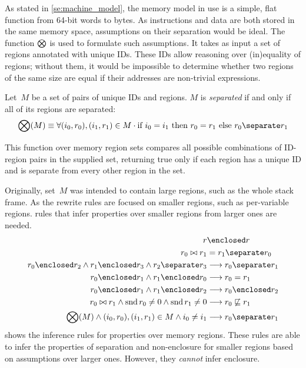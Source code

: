 As stated in \cref{se:machine_model}, the memory model in use is a simple,
flat function from 64-bit words to bytes.
As instructions and data are both stored in the same memory space,
assumptions on their separation would be ideal.
The function $\operatorname{\bigotimes}$ is used to formulate such assumptions.
It takes as input a set of regions annotated with unique IDs.
These IDs allow reasoning over (in)equality of regions; without them,
it would be impossible to determine whether two regions of the same size are equal
if their addresses are non-trivial expressions.
\begin{definition}
  Let~$M$ be a set of pairs of unique IDs and regions.
  $M$ is \emph{separated} if and only if all of its regions are separated:
  \begin{equation}
    \seps(M)\equiv\forall(i_0,r_0),(i_1,r_1)\in M\cdot
    \text{if }i_0=i_1\text{ then }r_0=r_1\text{ else }r_0\separate r_1
  \end{equation}
\end{definition}
This function over memory region sets compares all possible combinations of
ID-region pairs in the supplied set, returning true only if each region
has a unique ID and is separate from every other region in the set.

Originally, set~$M$ was intended to contain large regions,
such as the whole stack frame.
As the rewrite rules are focused on smaller regions, such as per-variable regions.
rules that infer properties over smaller regions from larger ones are needed.
\begin{subequations}\label{rules_sep_enc}
  \begin{align}
    r &\enclosed r \\
    r_0\bowtie r_1 &= r_1\separate r_0 \\
    r_0\enclosed r_2\wedge r_1\enclosed r_3\wedge r_2\separate r_3 &\longrightarrow r_0\separate r_1 \\
    r_0\enclosed r_1\wedge r_1\enclosed r_0 &\longrightarrow r_0=r_1 \\
    r_0\enclosed r_1\wedge r_1\enclosed r_2 &\longrightarrow r_0\enclosed r_2 \\
    r_0\bowtie r_1\wedge\snd{r_0}\neq 0\wedge\snd{r_1}\neq 0 &\longrightarrow r_0 \not\sqsubseteq r_1 \\
    \seps(M)\wedge(i_0,r_0),(i_1,r_1)\in M\wedge i_0\neq i_1 &\longrightarrow r_0\separate r_1
  \end{align}
\end{subequations}
 shows the inference rules for properties over memory regions.
These rules are able to infer the properties of separation and non-enclosure 
for smaller regions based on assumptions over larger ones.
However, they \emph{cannot} infer enclosure.


